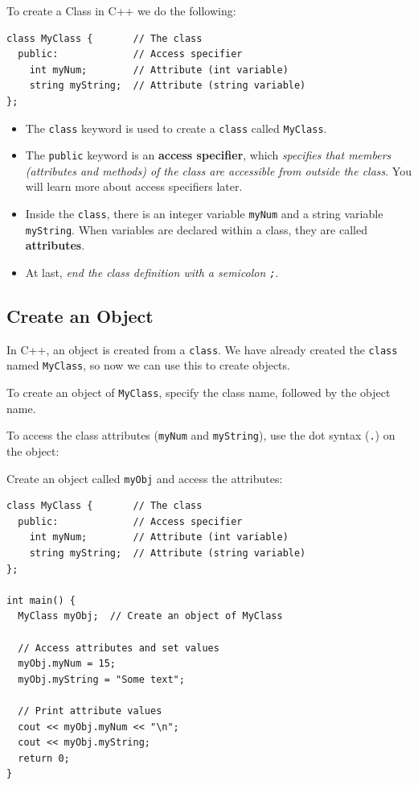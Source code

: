 \documentclass[../basic_programs.tex]{subfiles}
\begin{document}
    \begin{exa}
        To create a Class in C++ we do the following:

        \begin{lstlisting}[caption={caption},label=DescriptiveLabel]
class MyClass {       // The class
  public:             // Access specifier
    int myNum;        // Attribute (int variable)
    string myString;  // Attribute (string variable)
};
        \end{lstlisting}

        \begin{itemize}
            \item The \lstinline|class| keyword is used to create a \lstinline|class| called \lstinline|MyClass|.
            \item The \lstinline|public| keyword is an \textbf{access specifier}, which \textit{specifies that members (attributes and methods) of the class are accessible from outside the class}. You will learn more about access specifiers later.
            \item Inside the \lstinline|class|, there is an integer variable \lstinline|myNum| and a string variable \lstinline|myString|. When variables are declared within a class, they are called \textbf{attributes}.
            \item At last, \textit{end the class definition with a semicolon \lstinline|;|}.
        \end{itemize}
    \end{exa}

    \subsection{Create an Object}

    In C++, an object is created from a \lstinline|class|. We have already created the \lstinline|class| named \lstinline|MyClass|, so now we can use this to create objects.

    To create an object of \lstinline|MyClass|, specify the class name, followed by the object name.

    To access the class attributes (\lstinline|myNum| and \lstinline|myString|), use the dot syntax (\lstinline|.|) on the object:

    \begin{exa}
        Create an object called \lstinline|myObj| and access the attributes:
        \begin{lstlisting}[caption={caption},label=DescriptiveLabel]
class MyClass {       // The class
  public:             // Access specifier
    int myNum;        // Attribute (int variable)
    string myString;  // Attribute (string variable)
};

int main() {
  MyClass myObj;  // Create an object of MyClass

  // Access attributes and set values
  myObj.myNum = 15; 
  myObj.myString = "Some text";

  // Print attribute values
  cout << myObj.myNum << "\n";
  cout << myObj.myString;
  return 0;
}
        \end{lstlisting}
    \end{exa}
\end{document}
